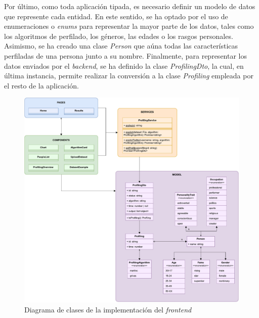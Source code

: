 \bigskip
Por último, como toda aplicación tipada, es necesario definir un modelo de datos que represente cada entidad. En este sentido, se ha optado
por el uso de enumeraciones o \textit{enums} para representar la mayor parte de los datos, tales como los algoritmos de perfilado, los géneros,
las edades o los rasgos personales. Asimismo, se ha creado una clase \textit{Person} que aúna todas las características
perfiladas de una persona junto a su nombre. Finalmente, para representar los datos enviados por el \textit{backend}, se ha definido la clase \textit{ProfilingDto},
la cual, en última instancia, permite realizar la conversión a la clase \textit{Profiling} empleada por el resto de la aplicación.


\bigskip
\begin{figure}[H]
	\centering
	\includegraphics[width=\textwidth]{diagramas/clases_front.pdf}
	\caption{Diagrama de clases de la implementación del \textit{frontend}}
	\label{fig:implementacion_clases_frontend}
\end{figure}

